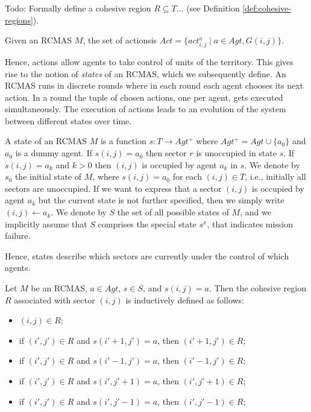 \documentclass{llncs}
\begin{document}
Todo: Formally define a cohesive region $R \subseteq T \ldots$ (see Definition \ref{def:cohesive-regions}). 
    
\begin{definition}[Actions]
Given an RCMAS $M$, the {set of actions}is $Act = \{ act^a_{i,j} \mid a \in Agt,  G(i,j)\}$.
\end{definition}

\noindent
Hence,  actions allow agents to take control of units of the territory.
This gives rise to the notion of \emph{states} of an RCMAS, which we subsequently define. 
An RCMAS runs in discrete rounds where in each round each agent chooses its next action.  In a round the tuple of chosen actions, one per agent, gets executed simultaneously.  The execution of actions leads to an evolution of the system between different states over time. 

\begin{definition}[States]
A state of an RCMAS $M$ is a function $s : T \rightarrow Agt^+$ where $Agt^+ = Agt \cup \{a_0\}$ and $a_0$ is a dummy agent.
If $s(i,j) = a_0$ then sector $r$ is unoccupied in state $s$. 
If $s(i,j) = a_k$ and $k > 0$ then $(i,j)$ is occupied by agent $a_k$ in $s$.
We denote by $s_0$ the initial state of $M$, where $s(i,j) = a_0$ for each $(i,j) \in T$, i.e., initially all sectors are unoccupied.
If we want to express that a sector $(i,j)$ is occupied by agent $a_k$ but the current state is not further specified, then we simply write $(i,j) \leftarrow a_k$.
We denote by $S$ the set of all possible states of $M$,  
and we implicitly assume that $S$ comprises the special state $s^x$,
that indicates mission failure. 
\end{definition}

\noindent
Hence, states describe which sectors are currently under the control of which agents.

\begin{definition}
\label{def:cohesive-regions}
Let $M$ be an RCMAS, $a \in Agt$, $s \in S$, and $s(i,j) = a$.
Then the cohesive region $R$ associated with sector $(i,j)$ 
is inductively defined as follows:
\begin{itemize}
\item $(i,j) \in R$;
\item if $(i',j') \in R$ and $s(i'+1,j') = a$, then $(i'+1,j') \in R$;
\item if $(i',j') \in R$ and $s(i'-1,j') = a$, then $(i'-1,j') \in R$;
\item if $(i',j') \in R$ and $s(i',j'+1) = a$, then $(i',j'+1) \in R$;
\item if $(i',j') \in R$ and $s(i',j'-1) = a$, then $(i',j'-1) \in R$;
\end{itemize}
\end{definition}
\end{document}

